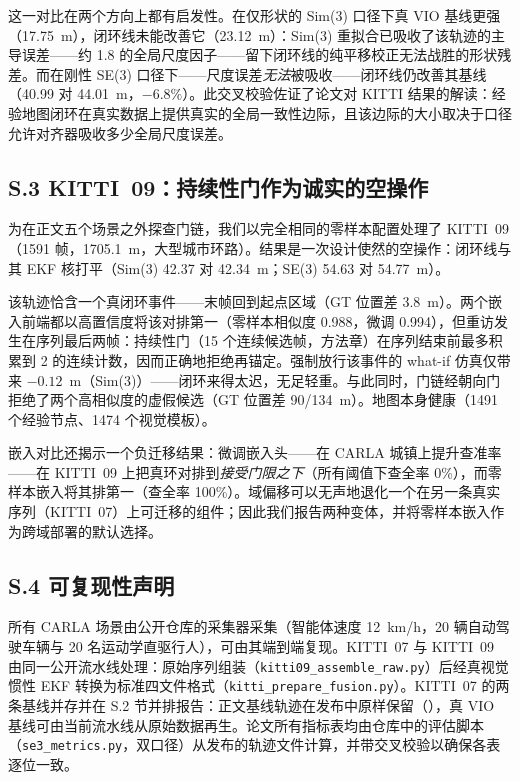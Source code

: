 这一对比在两个方向上都有启发性。在仅形状的 Sim(3) 口径下真 VIO 基线更强（17.75~m），闭环线未能改善它（23.12~m）：Sim(3) 重拟合已吸收了该轨迹的主导误差——约 1.8 的全局尺度因子——留下闭环线的纯平移校正无法战胜的形状残差。而在刚性 SE(3) 口径下——尺度误差\emph{无法}被吸收——闭环线仍改善其基线（40.99 对 44.01~m，$-6.8\%$）。此交叉校验佐证了论文对 KITTI 结果的解读：经验地图闭环在真实数据上提供真实的全局一致性边际，且该边际的大小取决于口径允许对齐器吸收多少全局尺度误差。

\subsection*{S.3 KITTI~09：持续性门作为诚实的空操作}

为在正文五个场景之外探查门链，我们以完全相同的零样本配置处理了 KITTI~09（1591 帧，1705.1~m，大型城市环路）。结果是一次设计使然的空操作：闭环线与其 EKF 核打平（Sim(3) 42.37 对 42.34~m；SE(3) 54.63 对 54.77~m）。

该轨迹恰含一个真闭环事件——末帧回到起点区域（GT 位置差 3.8~m）。两个嵌入前端都以高置信度将该对排第一（零样本相似度 0.988，微调 0.994），但重访发生在序列最后两帧：持续性门（15 个连续候选帧，方法章）在序列结束前最多积累到 2 的连续计数，因而正确地拒绝再锚定。强制放行该事件的 what-if 仿真仅带来 $-0.12$~m（Sim(3)）——闭环来得太迟，无足轻重。与此同时，门链经朝向门拒绝了两个高相似度的虚假候选（GT 位置差 90/134~m）。地图本身健康（1491 个经验节点、1474 个视觉模板）。

嵌入对比还揭示一个负迁移结果：微调嵌入头——在 CARLA 城镇上提升查准率——在 KITTI~09 上把真环对排到\emph{接受门限之下}（所有阈值下查全率 0\%），而零样本嵌入将其排第一（查全率 100\%）。域偏移可以无声地退化一个在另一条真实序列（KITTI~07）上可迁移的组件；因此我们报告两种变体，并将零样本嵌入作为跨域部署的默认选择。

\subsection*{S.4 可复现性声明}

所有 CARLA 场景由公开仓库的采集器采集（智能体速度 12~km/h，20 辆自动驾驶车辆与 20 名运动学直驱行人），可由其端到端复现。KITTI~07 与 KITTI~09 由同一公开流水线处理：原始序列组装（\texttt{kitti09\_assemble\_raw.py}）后经真视觉惯性 EKF 转换为标准四文件格式（\texttt{kitti\_prepare\_fusion.py}）。KITTI~07 的两条基线并存并在 S.2 节并排报告：正文基线轨迹在发布中原样保留（），真 VIO 基线可由当前流水线从原始数据再生。论文所有指标表均由仓库中的评估脚本（\texttt{se3\_metrics.py}，双口径）从发布的轨迹文件计算，并带交叉校验以确保各表逐位一致。
